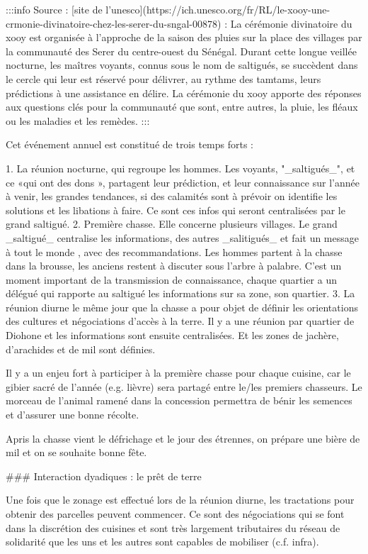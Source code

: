 :::info 
Source : [site de l'unesco](https://ich.unesco.org/fr/RL/le-xooy-une-crmonie-divinatoire-chez-les-serer-du-sngal-00878) : 
La cérémonie divinatoire du xooy est organisée à l’approche de la saison des pluies sur la place des villages par la communauté des Serer du centre-ouest du Sénégal. Durant cette longue veillée nocturne, les maîtres voyants, connus sous le nom de saltigués, se succèdent dans le cercle qui leur est réservé pour délivrer, au rythme des tamtams, leurs prédictions à une assistance en délire. La cérémonie du xooy apporte des réponses aux questions clés pour la communauté que sont, entre autres, la pluie, les fléaux ou les maladies et les remèdes. 
:::

Cet événement annuel est constitué de trois temps forts : 

1. La réunion nocturne, qui regroupe les hommes. Les voyants, "_saltigués_", et ce «qui ont des dons », partagent leur prédiction, et leur connaissance sur l'année à venir, les grandes tendances, si des calamités sont à prévoir on identifie les solutions et les libations à faire. Ce sont ces infos qui seront centralisées par le grand saltigué.
2. Première chasse. Elle concerne plusieurs villages.  Le grand _saltigué_ centralise les informations, des autres _salitigués_ et fait un message à tout le monde , avec des recommandations. Les hommes partent à la chasse dans la brousse, les anciens restent à discuter sous l'arbre à palabre. C'est un moment important de la transmission de connaissance, chaque quartier a un délégué qui rapporte au saltigué les informations sur sa zone, son quartier. 
3. La réunion diurne le même jour que la chasse a pour objet de définir les orientations des cultures et négociations d'accès à la terre. Il y a une réunion par quartier de Diohone et les informations sont ensuite centralisées. Et les zones de jachère, d'arachides et de mil sont définies.


Il y a un enjeu fort à participer à la première chasse pour chaque cuisine, car le gibier sacré de l'année (e.g. lièvre) sera partagé entre le/les premiers chasseurs. Le morceau de l'animal ramené dans la concession permettra de bénir les semences et d'assurer une bonne récolte.

Apris la chasse vient le défrichage  et  le jour des étrennes, on prépare une bière de mil et on se souhaite bonne fête.


### Interaction dyadiques : le prêt de terre 

Une fois que le zonage est effectué lors de la réunion diurne, les tractations pour obtenir des parcelles  peuvent commencer. Ce sont des négociations qui se font dans la discrétion des cuisines et sont très largement tributaires du réseau de solidarité que les uns et les autres sont capables de mobiliser (c.f. infra).

